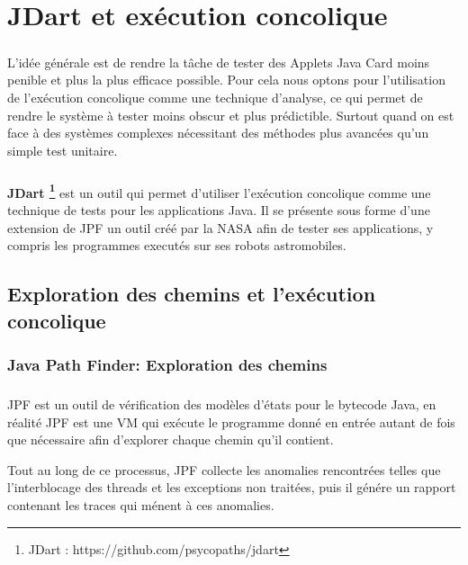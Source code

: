 \chapter{JDart et exécution concolique}
	\paragraph{}
		L'idée générale est de rendre la tâche de tester des Applets Java Card moins penible et plus la plus efficace possible.
		Pour cela nous optons pour l'utilisation de l'exécution concolique comme une technique d'analyse, ce qui permet de rendre 
		le système à tester moins obscur et plus prédictible. Surtout quand on est face à des systèmes complexes
		nécessitant des méthodes plus avancées qu'un simple test unitaire.
    
	\paragraph{}
		\textbf{JDart \footnote{JDart : https://github.com/psycopaths/jdart}} est un outil qui permet d'utiliser l'exécution concolique
		comme une technique de tests pour les applications Java.
		\newline
		Il se présente sous forme d'une extension de \gls{JPF} un outil créé par la NASA afin de tester ses applications, y compris les programmes executés sur ses robots astromobiles.
	\section{Exploration des chemins et l'exécution concolique}
		\subsection{Java Path Finder: Exploration des chemins}
			\nocite{JPF}
			
			\paragraph{}
				\gls{JPF} est un outil de vérification des modèles d'états pour le bytecode Java,
				en réalité \gls{JPF} est une \gls{VM} qui exécute le programme donné en entrée autant de fois que nécessaire
				afin d'explorer chaque chemin qu'il contient.
				
				Tout au long de ce processus, \gls{JPF} collecte les anomalies rencontrées telles que l'interblocage des threads et les exceptions non traitées, puis il génére un rapport contenant les traces qui ménent à ces anomalies.
	
